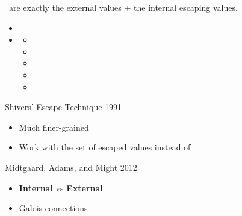 \begin{frame}

  \Large
  \unknown\ are exactly the external values + the internal escaping values.

\end{frame}

\begin{frame}

  \Large
  \begin{itemize}
  \item {}
  \item {}
    \begin{itemize}
    \Large
    \item {}
    \item {}
    \item {}
    \item {}
    \item {}
    \end{itemize}
  \end{itemize}

  \vspace{1em}


\end{frame}

\begin{frame}

  \Large
  Shivers' Escape Technique 1991

  \vspace{1em}

  \begin{itemize}
  \item Much finer-grained
  \item Work with the set of escaped values instead of \unknown
  \end{itemize}

\end{frame}

\begin{frame}

  \Large
  Midtgaard, Adams, and Might 2012

  \vspace{1em}

  \begin{itemize}
  \item \textbf{Internal} vs \textbf{External} \pause
  \item Galois connections
  \end{itemize}

\end{frame}

